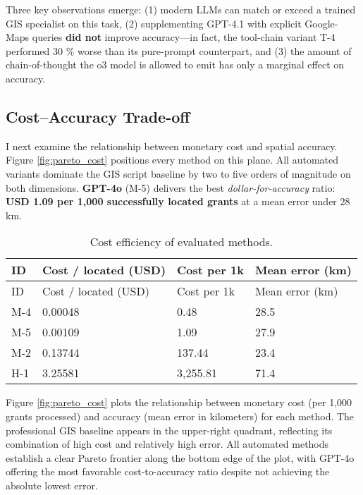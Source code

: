 Three key observations emerge: (1) modern LLMs can match or exceed a
trained GIS specialist on this task, (2) supplementing GPT-4.1 with
explicit Google-Maps queries \textbf{did not} improve accuracy---in
fact, the tool-chain variant T-4 performed 30 \% worse than its
pure-prompt counterpart, and (3) the amount of chain-of-thought the o3
model is allowed to emit has only a marginal effect on accuracy.

\clearpage

\subsection{Cost--Accuracy Trade-off}\label{costaccuracy-trade-off}

I next examine the relationship between monetary cost and spatial
accuracy. Figure \ref{fig:pareto_cost} positions every method on this
plane. All automated variants dominate the GIS script baseline by two to
five orders of magnitude on both dimensions. \textbf{GPT-4o} (M-5)
delivers the best \emph{dollar-for-accuracy} ratio: \textbf{USD 1.09 per
1,000 successfully located grants} at a mean error under 28 km.

\begin{longtable}[]{@{}llll@{}}
\caption{\label{tbl:cost}Cost efficiency of evaluated
methods.}\tabularnewline
\toprule\noalign{}
ID & Cost / located (USD) & Cost per 1k & Mean error (km) \\
\midrule\noalign{}
\endfirsthead
\toprule\noalign{}
ID & Cost / located (USD) & Cost per 1k & Mean error (km) \\
\midrule\noalign{}
\endhead
\bottomrule\noalign{}
\endlastfoot
M-4 & 0.00048 & 0.48 & 28.5 \\
M-5 & 0.00109 & 1.09 & 27.9 \\
M-2 & 0.13744 & 137.44 & 23.4 \\
H-1 & 3.25581 & 3,255.81 & 71.4 \\
\end{longtable}

Figure \ref{fig:pareto_cost} plots the relationship between monetary
cost (per 1,000 grants processed) and accuracy (mean error in
kilometers) for each method. The professional GIS baseline appears in
the upper-right quadrant, reflecting its combination of high cost and
relatively high error. All automated methods establish a clear Pareto
frontier along the bottom edge of the plot, with GPT-4o offering the
most favorable cost-to-accuracy ratio despite not achieving the absolute
lowest error.

